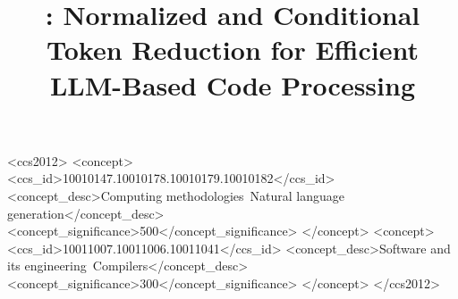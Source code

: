 \documentclass[acmsmall,screen,review,anonymous]{acmart}
\title{\tool: Normalized and Conditional Token Reduction for Efficient LLM-Based Code Processing}
\begin{document}
\begin{abstract}

\end{abstract}

\begin{CCSXML}
<ccs2012>
 <concept>
  <ccs_id>10010147.10010178.10010179.10010182</ccs_id>
  <concept_desc>Computing methodologies~Natural language generation</concept_desc>
  <concept_significance>500</concept_significance>
 </concept>
 <concept>
  <ccs_id>10011007.10011006.10011041</ccs_id>
  <concept_desc>Software and its engineering~Compilers</concept_desc>
  <concept_significance>300</concept_significance>
 </concept>
</ccs2012>
\end{CCSXML}



\maketitle







% 





\end{document}
